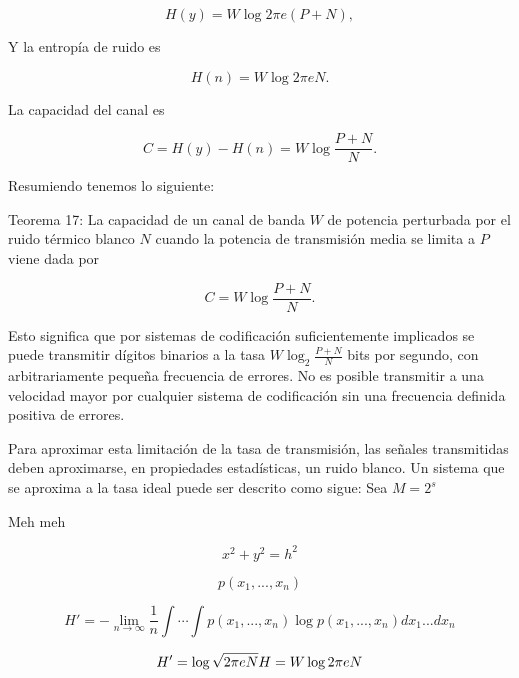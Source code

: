 	\begin{equation}
		H(y) = W\log 2\pi e(P+N),
	\end{equation}
	
	Y la entrop\'ia de ruido es
	
	\begin{equation}
		H(n) = W\log 2\pi eN.
	\end{equation}
	
	La capacidad del canal es
	
	\begin{equation}
		C = H(y) - H(n) = W\log \frac{P + N}{N}.
	\end{equation}
	
	Resumiendo tenemos lo siguiente:
	
	Teorema 17: La capacidad de un canal de banda $W$ de potencia perturbada por el ruido
	t\'ermico blanco $N$ cuando la potencia de transmisi\'on media se limita a $P$ viene
	dada por
	
	\begin{equation}
		C = W\log \frac{P + N}{N}.
	\end{equation}
	
	Esto significa que por sistemas de codificaci\'on suficientemente implicados se puede
	transmitir d\'igitos binarios a la tasa $W \log_{2}\frac{P + N}{N}$ bits por segundo,
	con arbitrariamente peque\~na frecuencia de errores. No es posible transmitir a una
	velocidad mayor por cualquier sistema de codificaci\'on sin una frecuencia
	definida positiva de errores.
	
	Para aproximar esta limitaci\'on de la tasa de transmisi\'on, las se\~nales transmitidas
	deben aproximarse, en propiedades estad\'isticas, un ruido blanco. Un sistema que se 
	aproxima a la tasa ideal puede ser descrito como sigue: Sea $M = 2^s$
	
	Meh meh
	
	\begin{displaymath}
		x^{2}+y^{2}=h^2
	\end{displaymath}

	\begin{equation}
		p\left ( x_{1},...,x_{n}\right )
	\end{equation}

	\begin{equation}
		{H}'=-\lim_{n\rightarrow \infty }\frac{1}{n}\int \cdots \int p\left ( 							x_{1},...,x_{n}\right ) \log p\left ( x_{1},...,x_{n}\right )dx_{1}...dx_{n}
	\end{equation}

	\begin{equation}
		{H}'=\log \sqrt{2\pi eN}
		\newline
		H=W\log 2\pi eN
	\end{equation}		
	



